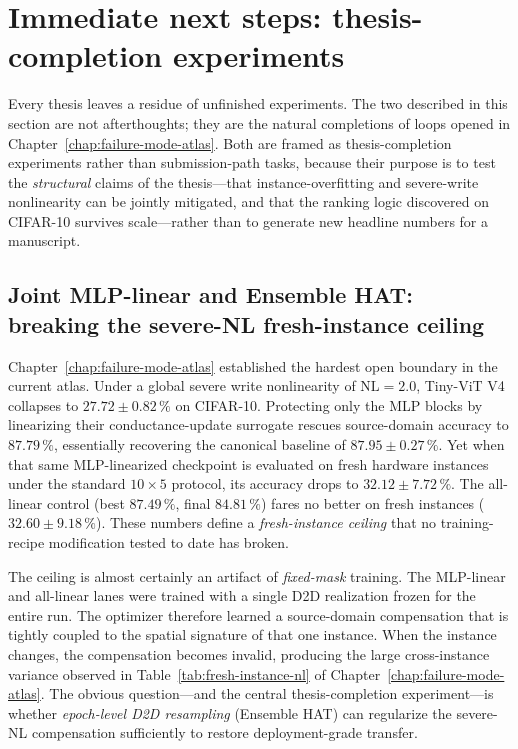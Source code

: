 \section{Immediate next steps: thesis-completion experiments}
\label{sec:immediate-next-steps}

Every thesis leaves a residue of unfinished experiments.  The two described in this section are not afterthoughts; they are the natural completions of loops opened in Chapter~\ref{chap:failure-mode-atlas}.  Both are framed as thesis-completion experiments rather than submission-path tasks, because their purpose is to test the \emph{structural} claims of the thesis---that instance-overfitting and severe-write nonlinearity can be jointly mitigated, and that the ranking logic discovered on CIFAR-10 survives scale---rather than to generate new headline numbers for a manuscript.

\subsection{Joint MLP-linear and Ensemble HAT: breaking the severe-NL fresh-instance ceiling}
\label{subsec:joint-mlp-ensemble}

Chapter~\ref{chap:failure-mode-atlas} established the hardest open boundary in the current atlas.  Under a global severe write nonlinearity of $\mathrm{NL}=2.0$, Tiny-ViT V4 collapses to $27.72\pm0.82\,\%$ on CIFAR-10.  Protecting only the MLP blocks by linearizing their conductance-update surrogate rescues source-domain accuracy to $87.79\,\%$, essentially recovering the canonical baseline of $87.95\pm0.27\,\%$.  Yet when that same MLP-linearized checkpoint is evaluated on fresh hardware instances under the standard $10 \times 5$ protocol, its accuracy drops to $32.12\pm7.72\,\%$.  The all-linear control (best $87.49\,\%$, final $84.81\,\%$) fares no better on fresh instances ($32.60\pm9.18\,\%$).  These numbers define a \emph{fresh-instance ceiling} that no training-recipe modification tested to date has broken.

The ceiling is almost certainly an artifact of \emph{fixed-mask} training.  The MLP-linear and all-linear lanes were trained with a single D2D realization frozen for the entire run.  The optimizer therefore learned a source-domain compensation that is tightly coupled to the spatial signature of that one instance.  When the instance changes, the compensation becomes invalid, producing the large cross-instance variance observed in Table~\ref{tab:fresh-instance-nl} of Chapter~\ref{chap:failure-mode-atlas}.  The obvious question---and the central thesis-completion experiment---is whether \emph{epoch-level D2D resampling} (Ensemble HAT) can regularize the severe-NL compensation sufficiently to restore deployment-grade transfer.


